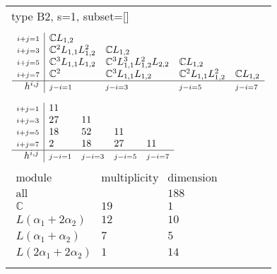 \documentclass[crop,border=2mm]{standalone}
\begin{document}
\begin{tabular}{l}
{\huge type B2, s=1, subset=[]}\\ \\


$\displaystyle
\begin{array}{r|l l l l}
	{\scriptstyle i+j=1}&\mathbb{C}L_{1,2}&&&\\
	{\scriptstyle i+j=3}&\mathbb{C}^{2}L_{1,1}L_{1,2}^{2}&\mathbb{C}L_{1,2}&&\\
	{\scriptstyle i+j=5}&\mathbb{C}^{3}L_{1,1}L_{1,2}&\mathbb{C}^{3}L_{1,1}^{3}L_{1,2}^{2}L_{2,2}&\mathbb{C}L_{1,2}&\\
	{\scriptstyle i+j=7}&\mathbb{C}^{2}&\mathbb{C}^{3}L_{1,1}L_{1,2}&\mathbb{C}^{2}L_{1,1}L_{1,2}^{2}&\mathbb{C}L_{1,2}\\
	\hline h^{i,j}&{\scriptstyle j-i=1}&{\scriptstyle j-i=3}&{\scriptstyle j-i=5}&{\scriptstyle j-i=7}
\end{array}
$ \\ \\


$\displaystyle
\begin{array}{r|l l l l}
	{\scriptstyle i+j=1}&11&&&\\
	{\scriptstyle i+j=3}&27&11&&\\
	{\scriptstyle i+j=5}&18&52&11&\\
	{\scriptstyle i+j=7}&2&18&27&11\\
	\hline h^{i,j}&{\scriptstyle j-i=1}&{\scriptstyle j-i=3}&{\scriptstyle j-i=5}&{\scriptstyle j-i=7}
\end{array}
$ \\ \\


$\displaystyle
\begin{array}{rll}
	\text{module}&\text{multiplicity}&\text{dimension} \\ \hline \text{all}&&188 \\
	\mathbb{C}&19&1\\
	L\left(\alpha_{1}+ 2\alpha_{2}\right)&12&10\\
	L\left(\alpha_{1}+\alpha_{2}\right)&7&5\\
	L\left( 2\alpha_{1}+ 2\alpha_{2}\right)&1&14
\end{array}
$ \\ \\

\end{tabular}
\end{document}
